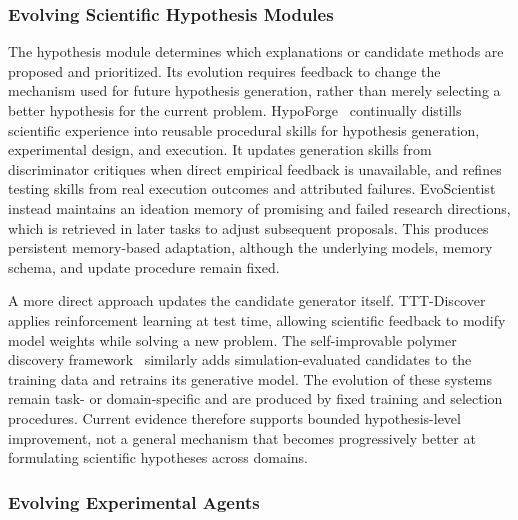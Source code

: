 \subsubsection{Evolving Scientific Hypothesis Modules}

The hypothesis module determines which explanations or candidate methods are proposed and prioritized. Its evolution requires feedback to change the mechanism used for future hypothesis generation, rather than merely selecting a better hypothesis for the current problem. HypoForge~\cite{qian2026hypoforge} continually distills scientific experience into reusable procedural skills for hypothesis generation, experimental design, and execution. It updates generation skills from discriminator critiques when direct empirical feedback is unavailable, and refines testing skills from real execution outcomes and attributed failures.
EvoScientist~\cite{lyu2026evoscientist} instead maintains an ideation memory of promising and failed research directions, which is retrieved in later tasks to adjust subsequent proposals. This produces persistent memory-based adaptation, although the underlying models, memory schema, and update procedure remain fixed.

A more direct approach updates the candidate generator itself. TTT-Discover~\cite{yuksekgonul2026discover} applies reinforcement learning at test time, allowing scientific feedback to modify model weights while solving a new problem. The self-improvable polymer discovery framework~\cite{khajeh2024polymer} similarly adds simulation-evaluated candidates to the training data and retrains its generative model. 
The evolution of these systems remain task- or domain-specific and are produced by fixed training and selection procedures. 
Current evidence therefore supports bounded hypothesis-level improvement, not a general mechanism that becomes progressively better at formulating scientific hypotheses across domains.


\subsubsection{Evolving Experimental Agents}


